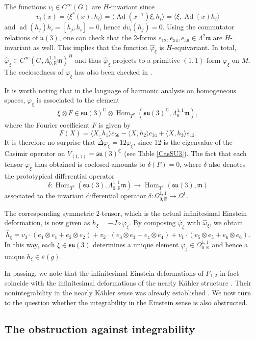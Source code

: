 \documentclass[12pt]{scrartcl}
\theoremstyle{plain}
\theoremstyle{definition}
\newcommand{\R}{\mathbb{R}}%
\newcommand{\C}{\mathbb{C}}%
\newcommand{\Hom}{\operatorname{Hom}}%
\newcommand{\Ad}{\operatorname{Ad}}%
\newcommand{\ad}{\operatorname{ad}}%
\newcommand{\su}{\mathfrak{su}}%
\renewcommand{\u}{\mathfrak{u}}%
\newcommand{\m}{\mathfrak{m}}%
\begin{document}
The functions $v_i\in C^\infty(G)$ are $H$-invariant since
\[v_i(x)=\langle\xi^\ast(x),h_i\rangle=\langle\Ad(x^{-1})\xi,h_i\rangle=\langle\xi,\Ad(x)h_i\rangle\]
and $\ad(h_j)h_i=[h_j,h_i]=0$, hence $dv_i(h_j)=0$. Using the commutator relations of $\u(3)$, one can check that the $2$-forms $e_{12},e_{34},e_{56}\in\Lambda^2\m$ are $H$-invariant as well. This implies that the function $\hat\varphi_\xi$ is $H$-equivariant. In total, $\hat\varphi_\xi\in C^\infty(G,\Lambda^{1,1}_{0,\R}\m)^H$ and thus $\hat\varphi_\xi$ projects to a primitive $(1,1)$-form $\varphi_\xi$ on $M$. The coclosedness of $\varphi_\xi$ has also been checked in \cite[Sec.~6]{hermitianlaplace}.

It is worth noting that in the language of harmonic analysis on homogeneous spaces, $\varphi_\xi$ is associated to the element
\[\xi\otimes F\in\su(3)^\C\otimes\Hom_{T^2}(\su(3)^\C,\Lambda^{1,1}_0\m),\]
where the Fourier coefficient $F$ is given by
\[F(X)=\langle X,h_1\rangle e_{56}-\langle X,h_2\rangle e_{34}+\langle X,h_3\rangle e_{12}.\]
It is therefore no surprise that $\bar\Delta\varphi_\xi=12\varphi_\xi$, since $12$ is the eigenvalue of the Casimir operator on $V_{(1,1)}=\su(3)^\C$ (see Table \ref{CasSU3}). The fact that each tensor $\varphi_\xi$ thus obtained is coclosed amounts to $\delta(F)=0$, where $\delta$ also denotes the prototypical differential operator
\[\delta: \Hom_{T^2}(\su(3),\Lambda^{1,1}_{0,\R}\m)\longrightarrow\Hom_{T^2}(\su(3),\m)\]
associated to the invariant differential operator $\delta: \Omega^{1,1}_{0,\R}\to\Omega^1$.

The corresponding symmetric $2$-tensor, which is the actual infinitesimal Einstein deformation, is now given as $h_\xi=-J\circ\varphi_\xi$. By composing $\hat\varphi_\xi$ with $\hat\omega_\xi$, we obtain
\[\hat h_\xi=v_3\cdot(e_1\otimes e_1+e_2\otimes e_2)+v_2\cdot(e_3\otimes e_3+e_4\otimes e_4)+v_1\cdot(e_5\otimes e_5+e_6\otimes e_6).\]
In this way, each $\xi\in\su(3)$ determines a unique element $\varphi_\xi\in\Omega^{1,1}_{0,\R}$ and hence a unique $h_\xi\in\varepsilon(g)$.

In passing, we note that the infinitesimal Einstein deformations of $F_{1,2}$ in fact coincide with the infinitesimal deformations of the nearly Kähler structure \cite[Cor.~5.12]{hermitianlaplace}. Their nonintegrability in the nearly Kähler sense was already established \cite{foscolo}. We now turn to the question whether the integrability in the Einstein sense is also obstructed.

\subsection{The obstruction against integrability}
\label{sec:flagobstr}
\end{document}
